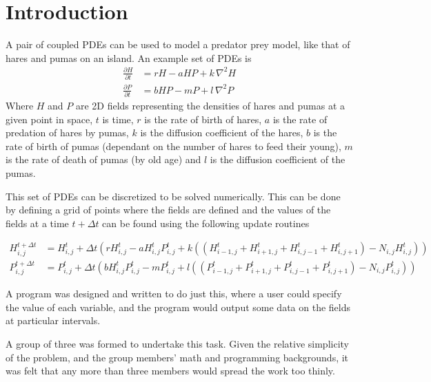 \section{Introduction}
A pair of coupled PDEs can be used to model a predator prey model, like
that of hares and pumas on an island.
An example set of PDEs is
\begin{align*}
  \frac{\partial{H}}{\partial{t}} &= rH - aHP + k\,{\nabla^2}H \\
  \frac{\partial{P}}{\partial{t}} &= bHP - mP + l\,{\nabla^2}P
\end{align*}
Where $H$ and $P$ are 2D fields representing the densities of hares and pumas
at a given point in space,
$t$ is time,
$r$ is the rate of birth of hares,
$a$ is the rate of predation of hares by pumas,
$k$ is the diffusion coefficient of the hares,
$b$ is the rate of birth of pumas (dependant on the number of hares to
    feed their young),
$m$ is the rate of death of pumas (by old age) and
$l$ is the diffusion coefficient of the pumas.

This set of PDEs can be discretized to be solved numerically.
This can be done by defining a grid of points where the fields are
defined and the values of the fields at a time $t + \Delta{t}$ can
be found using the following update routines

\begin{align*}
  H^{t+\Delta{t}}_{i,j} &= H^{t}_{i,j}
       + \Delta{t}(
           rH^{t}_{i,j} - a H^{t}_{i,j} P^{t}_{i,j}
           + k (
             (H^{t}_{i-1,j} + H^{t}_{i+1,j} + H^{t}_{i,j-1} + H^{t}_{i,j+1})
             -N_{i,j} H^{t}_{i,j}
           )
         ) \\
%
  P^{t+\Delta{t}}_{i,j} &= P^{t}_{i,j}
       + \Delta{t}(
           b H^{t}_{i,j} P^{t}_{i,j} - mP^{t}_{i,j}
           + l (
             (P^{t}_{i-1,j} + P^{t}_{i+1,j} + P^{t}_{i,j-1} + P^{t}_{i,j+1})
             -N_{i,j} P^{t}_{i,j}
           )
         )
\end{align*}

A program was designed and written to do just this, where a user could
specify the value of each variable, and the program would output some
data on the fields at particular intervals.

A group of three was formed to undertake this task.
Given the relative simplicity of the problem, and the group members'
math and programming backgrounds, it was felt that any more than three
members would spread the work too thinly.
